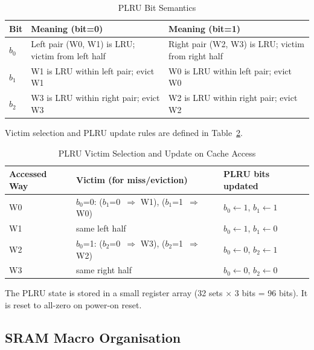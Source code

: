 \begin{table}[H]
\caption{PLRU Bit Semantics}
\label{tab:asPlruBits}
\centering
\begin{tabularx}{\textwidth}{|l |X |X|}
  \hline
  Bit & Meaning (bit=0) & Meaning (bit=1) \\
  \hline
  \hline
  $b_0$ & Left pair (W0, W1) is LRU; victim from left half & Right pair (W2, W3) is LRU; victim from right half \\
  \hline
  $b_1$ & W1 is LRU within left pair; evict W1 & W0 is LRU within left pair; evict W0 \\
  \hline
  $b_2$ & W3 is LRU within right pair; evict W3 & W2 is LRU within right pair; evict W2 \\
  \hline
\end{tabularx}
\end{table}

Victim selection and PLRU update rules are defined in Table~\ref{tab:asPlruUpdate}.

\begin{table}[H]
\caption{PLRU Victim Selection and Update on Cache Access}
\label{tab:asPlruUpdate}
\centering
\begin{tabularx}{\textwidth}{|l |l |X|}
  \hline
  Accessed Way & Victim (for miss/eviction) & PLRU bits updated \\
  \hline
  \hline
  W0 & $b_0$=0: ($b_1$=0~$\Rightarrow$ W1), ($b_1$=1~$\Rightarrow$ W0) & $b_0 \leftarrow 1$,\; $b_1 \leftarrow 1$ \\
  \hline
  W1 & same left half & $b_0 \leftarrow 1$,\; $b_1 \leftarrow 0$ \\
  \hline
  W2 & $b_0$=1: ($b_2$=0~$\Rightarrow$ W3), ($b_2$=1~$\Rightarrow$ W2) & $b_0 \leftarrow 0$,\; $b_2 \leftarrow 1$ \\
  \hline
  W3 & same right half & $b_0 \leftarrow 0$,\; $b_2 \leftarrow 0$ \\
  \hline
\end{tabularx}
\end{table}

The PLRU state is stored in a small register array (32 sets $\times$ 3 bits = 96 bits).
It is reset to all-zero on power-on reset.

\subsection{SRAM Macro Organisation}

